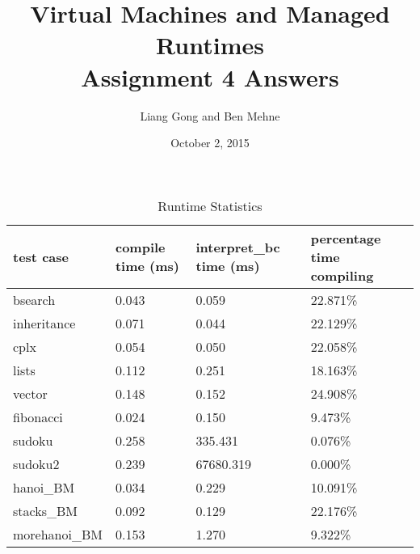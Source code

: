 \documentclass[notitlepage]{report}
\title{\vspace{-0.5in}Virtual Machines and Managed Runtimes \\ Assignment 4 Answers}
\date{\vspace{-0.5in}October 2, 2015}
\author{\vspace{-0.5in}Liang Gong and Ben Mehne\vspace{-0.5in}}
\begin{document}
\maketitle

\begin{table}[!htp]
\centering
\caption{Runtime Statistics}
\label{statistics}
{\footnotesize
\begin{tabular}{llll}
\toprule
test case & compile time (ms)    & interpret\_bc time (ms) & percentage time compiling \\
\midrule
bsearch        & 0.043          & 0.059          & 22.871\%     \\
inheritance    & 0.071          & 0.044          & 22.129\%     \\
cplx           & 0.054          & 0.050          & 22.058\%     \\
lists          & 0.112          & 0.251          & 18.163\%     \\
vector         & 0.148          & 0.152          & 24.908\%     \\
fibonacci      & 0.024          & 0.150          & 9.473\%      \\
sudoku         & 0.258          & 335.431        & 0.076\%      \\
sudoku2        & 0.239          & 67680.319      & 0.000\%      \\
hanoi\_BM      & 0.034          & 0.229          & 10.091\%     \\
stacks\_BM     & 0.092          & 0.129          & 22.176\%     \\
morehanoi\_BM  & 0.153          & 1.270          & 9.322\%      \\
\bottomrule
\end{tabular}
}
\end{table}
\end{document}

